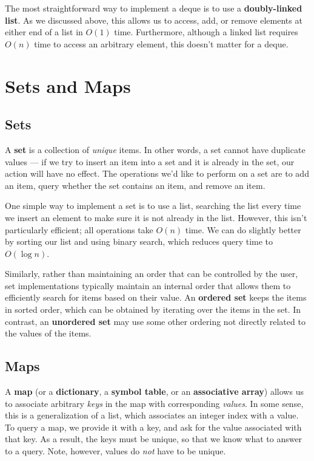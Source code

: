 The most straightforward way to implement a deque is to use a \textbf{doubly-linked list}. As we discussed above, this allows us to access, add, or remove elements at either end of a list in $O(1)$ time. Furthermore, although a linked list requires $O(n)$ time to access an arbitrary element, this doesn't matter for a deque.


\section{Sets and Maps}

\subsection{Sets}
A \textbf{set} is a collection of \textit{unique} items. In other words, a set cannot have duplicate values --- if we try to insert an item into a set and it is already in the set, our action will have no effect. The operations we'd like to perform on a set are to add an item, query whether the set contains an item, and remove an item.

One simple way to implement a set is to use a list, searching the list every time we insert an element to make sure it is not already in the list. However, this isn't particularly efficient; all operations take $O(n)$ time. We can do slightly better by sorting our list and using binary search, which reduces query time to $O(\log n)$.

Similarly, rather than maintaining an order that can be controlled by the user, set implementations typically maintain an internal order that allows them to efficiently search for items based on their value. An \textbf{ordered set} keeps the items in sorted order, which can be obtained by iterating over the items in the set. In contrast, an \textbf{unordered set} may use some other ordering not directly related to the values of the items.


\subsection{Maps}

A \textbf{map} (or a \textbf{dictionary}, a \textbf{symbol table}, or an \textbf{associative array}) allows us to associate arbitrary \textit{keys} in the map with corresponding \textit{values}. In some sense, this is a generalization of a list, which associates an integer index with a value. To query a map, we provide it with a key, and ask for the value associated with that key. As a result, the keys must be unique, so that we know what to answer to a query. Note, however, values do \textit{not} have to be unique.

